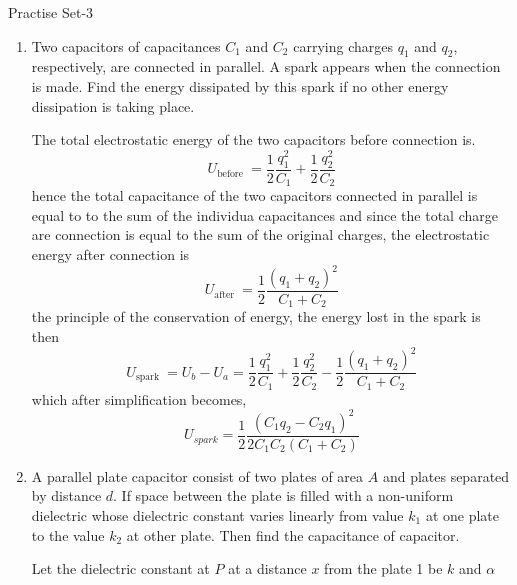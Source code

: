 \newpage 
\begin{abox}
	Practise Set-3
\end{abox}
\begin{enumerate} [label=\color{ocre}\textbf{\arabic*.}]
		\item  Two capacitors of capacitances $C_{1}$ and $C_{2}$ carrying charges $q_{1}$ and $q_{2}$, respectively, are connected in parallel. A spark appears when the connection is made. Find the energy dissipated by this spark if no other energy dissipation is taking place.
	\begin{answer}
		The total electrostatic energy of the two capacitors before connection is.
		$$
		U_{\text {before }}=\frac{1}{2} \frac{q_{1}^{2}}{C_{1}}+\frac{1}{2} \frac{q_{2}^{2}}{C_{2}}
		$$
		hence the total capacitance of the two capacitors connected in parallel is equal to to the sum of the individua capacitances and since the total charge are connection is equal to the sum of the original charges, the electrostatic energy after connection is
		$$
		U_{\text {after }}=\frac{1}{2} \frac{\left(q_{1}+q_{2}\right)^{2}}{C_{1}+C_{2}}
		$$
		the principle of the conservation of energy, the energy lost in the spark is then
		$$
		U_{\text {spark }}=U_{b}-U_{a}=\frac{1}{2} \frac{q_{1}^{2}}{C_{1}}+\frac{1}{2} \frac{q_{2}^{2}}{C_{2}}-\frac{1}{2} \frac{\left(q_{1}+q_{2}\right)^{2}}{C_{1}+C_{2}}
		$$
		which after simplification becomes,
		$$
		U_{s p a r k}=\frac{1}{2} \frac{\left(C_{1} q_{2}-C_{2} q_{1}\right)^{2}}{2 C_{1} C_{2}\left(C_{1}+C_{2}\right)}
		$$
	\end{answer}
	\item A parallel plate capacitor consist of two plates of area $A$ and plates separated by distance $d$. If space between the plate is filled with a non-uniform dielectric whose dielectric constant varies linearly from value $k_{1}$ at one plate to the value $k_{2}$ at other plate. Then find the capacitance of capacitor.
	\begin{answer}
		Let the dielectric constant at $P$ at a distance $x$ from the plate 1 be $k$ and $\alpha$
		

\end{answer}
\end{enumerate}
